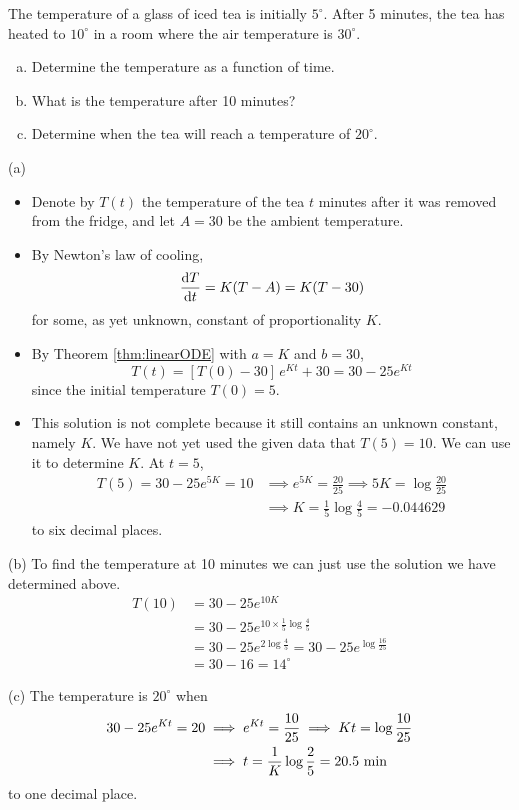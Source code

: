 \begin{eg}\label{eg:SDEcoolingA}
The temperature of a glass of iced tea is initially $5^\circ$.
After 5 minutes, the tea has heated to $10^\circ$ in a room where the air
temperature is $30^\circ$.
\begin{enumerate}[(a)]
\item   Determine the temperature as a function of time.
\item   What is the temperature after 10 minutes?
\item  Determine when the tea will reach a temperature of $20^\circ$.
\end{enumerate}

\soln  (a)
\begin{itemize}
\item
Denote by $T(t)$ the temperature of the tea $t$ minutes
after it was removed from the fridge, and let $A=30$ be the ambient
temperature.
\item
By Newton's law of cooling,
\begin{equation*}
\diff{T}{t}=K(T-A) = K(T-30)
\end{equation*}
for some, as yet unknown, constant of proportionality $K$.
\item
By Theorem \ref{thm:linearODE} with $a=K$ and $b=30$,
\begin{equation*}
T(t) = [T(0)-30]\,e^{Kt} + 30
      =30-25 e^{Kt}
\end{equation*}
since the initial temperature $T(0)=5$.
\item
This solution is not complete
because it still contains an unknown constant, namely $K$. We have not
yet used the given data that $T(5)=10$. We can use it to determine $K$.
At $t=5$,
\begin{align*}
T(5)=30-25 e^{5K}=10
&\implies e^{5K}=\frac{20}{25}
\implies 5K=\log\frac{20}{25}\\
&\implies K=\frac{1}{5}\log\frac{4}{5}=-0.044629
\end{align*}
to six decimal places.
\end{itemize}

\noindent(b)
To find the temperature at 10 minutes we can just use the solution
we have determined above.
\begin{align*}
T(10)&=30-25 e^{10K}\\
  &=30-25 e^{10\times\frac{1}{5}\log\frac{4}{5}} \\
  &=30-25 e^{2\log\frac{4}{5}}  = 30-25 e^{\log\frac{16}{25}}\\
  &=30-16=\text{$14^\circ$}
\end{align*}


\noindent(c) The temperature is $20^\circ$ when
\begin{align*}
30-25 e^{Kt}=20
&\implies e^{Kt}=\frac{10}{25}
\implies Kt=\log\frac{10}{25}\\
&\implies t=\frac{1}{K}\log\frac{2}{5}=\hbox{20.5 min}
\end{align*}
to one decimal place.
\end{eg}




